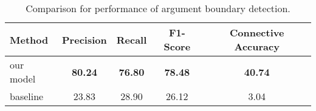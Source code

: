 \begin{table}[!htbp]
\centering
\begin{tabular}{|l|c|c|c|c|}
\hline

    Method          &     Precision &     Recall &     F1-Score &     Connective Accuracy \\ \hline
    our model       & \bf 80.24     & \bf 76.80  & \bf 78.48    & \bf 40.74               \\ \hline
    baseline        &     23.83     &     28.90  &     26.12    &      3.04               \\ \hline

\end{tabular}
\caption{\label{t:argument-baseline} Comparison for performance of argument boundary detection. }
\end{table}

